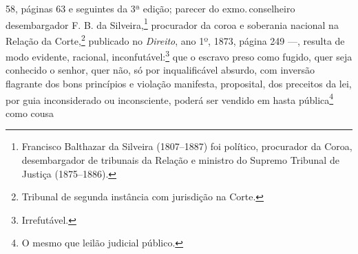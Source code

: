 58, páginas 63 e seguintes da 3ª edição; parecer do exmo.\,conselheiro
desembargador F. B. da Silveira,\footnote{Francisco Balthazar \label{balthazar}
  da Silveira (1807--1887) foi político, procurador da Coroa,
  desembargador de tribunais da Relação e ministro do Supremo Tribunal de Justiça (1875--1886).} procurador da coroa e soberania nacional na
Relação da Corte,\footnote{Tribunal de segunda instância com jurisdição
  na Corte.} publicado no \emph{Direito}, ano 1º, 1873, página 249
---, resulta de modo evidente, racional, inconfutável:\footnote{
  Irrefutável.} que o escravo preso como fugido, quer seja conhecido o
senhor, quer não, só por inqualificável absurdo, com inversão flagrante
dos bons princípios e violação manifesta, proposital, dos preceitos da
lei, por guia inconsiderado ou inconsciente, poderá ser vendido em hasta
pública\footnote{O mesmo que leilão judicial público.} como cousa
